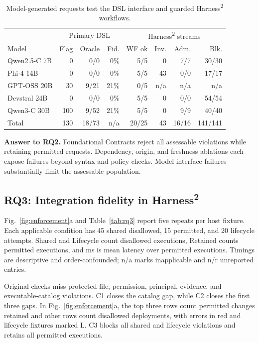 \documentclass[letterpaper,journal]{IEEEtran}
\newcommand{\harness}{Harness\textsuperscript{2}}
\begin{document}
\begin{table}[t]\caption{Model-generated requests test the DSL interface and guarded \harness{} workflows.}\label{tab:models}\centering\footnotesize
\setlength{\tabcolsep}{3.2pt}
\begin{tabular}{lrrr|rrrr}\toprule
& \multicolumn{3}{c|}{Primary DSL} & \multicolumn{4}{c}{\harness{} streams}\\
Model & Flag & Oracle & Fid. & WF ok & Inv. & Adm. & Blk.\\\midrule
Qwen2.5-C 7B & 0 & 0/0 & 0\% & 5/5 & 0 & 7/7 & 30/30\\
Phi-4 14B & 0 & 0/0 & 0\% & 5/5 & 43 & 0/0 & 17/17\\
GPT-OSS 20B & 30 & 9/21 & 21\% & 0/5 & n/a & n/a & n/a\\
Devstral 24B & 0 & 0/0 & 0\% & 5/5 & 0 & 0/0 & 54/54\\
Qwen3-C 30B & 100 & 9/52 & 21\% & 5/5 & 0 & 9/9 & 40/40\\\midrule
Total & 130 & 18/73 & n/a & 20/25 & 43 & 16/16 & 141/141\\\bottomrule
\end{tabular}\end{table}

\textbf{Answer to RQ2.} Foundational Contracts reject all assessable violations while retaining permitted requests. Dependency, origin, and freshness ablations each expose failures beyond syntax and policy checks. Model interface failures substantially limit the assessable population.

\subsection{RQ3: Integration fidelity in \harness{}}\label{sec:rq3}
Fig.~\ref{fig:enforcement}a and Table~\ref{tab:rq3} report five repeats per host fixture. Each applicable condition has 45 shared disallowed, 15 permitted, and 20 lifecycle attempts. Shared and Lifecycle count disallowed executions, Retained counts permitted executions, and ms is mean latency over permitted executions. Timings are descriptive and order-confounded; n/a marks inapplicable and n/r unreported entries.

Original checks miss protected-file, permission, principal, evidence, and executable-catalog violations. C1 closes the catalog gap, while C2 closes the first three gaps. In Fig.~\ref{fig:enforcement}a, the top three rows count permitted changes retained and other rows count disallowed deployments, with errors in red and lifecycle fixtures marked L. C3 blocks all shared and lifecycle violations and retains all permitted executions.
\end{document}
